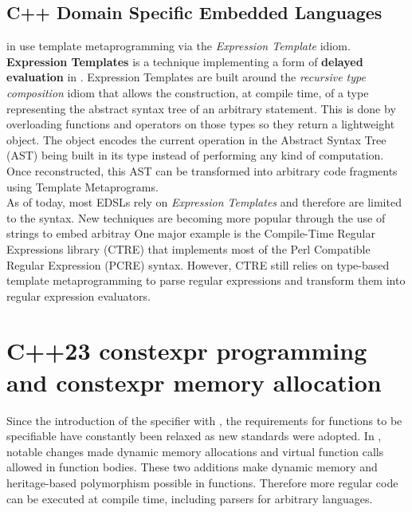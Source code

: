 \documentclass[../../main.tex]{subfiles}
\begin{document}
\subsection{C++ Domain Specific Embedded Languages}

\dsels in \cpp use template metaprogramming via the \textit{Expression
Template} idiom.
\textbf{Expression Templates} \cite{veldhuizen:1995,vandevoorde:2002} is a
technique implementing a
form of \textbf{delayed evaluation} in \cpp \cite{spinellis:2001}. Expression
Templates are built around the \textit{recursive type composition}
idiom \cite{jarvi:1998} that allows the construction, at compile time, of a type
representing the abstract syntax tree of an arbitrary statement. This is done by
overloading functions and operators on those types so they return a lightweight
object. The object encodes the current operation in the Abstract Syntax Tree
(AST) being built in its type instead of performing any kind of computation. Once
reconstructed, this AST can be transformed into arbitrary code fragments using
Template Metaprograms.\\

As of today, most \cpp EDSLs rely on \textit{Expression Templates} and therefore
are limited to the \cpp syntax. New techniques are becoming more popular through
the use of \constexpr strings to embed arbitray  One major example is
the Compile-Time Regular Expressions library (CTRE)\cite{ctre} that implements
most of the Perl Compatible Regular Expression (PCRE) syntax. However, CTRE
still relies on type-based template metaprogramming to parse regular expressions
and transform them into regular expression evaluators.


\section{C++23 constexpr programming and constexpr memory allocation}

Since the introduction of the \constexpr specifier with , the requirements
for functions to be \constexpr specifiable have constantly been relaxed as new
\cpp standards were adopted. In , notable changes made dynamic memory
allocations\cite{constexpr-memory} and virtual \constexpr function
calls\cite{virtual-constexpr} allowed in \constexpr function
bodies. These two additions make dynamic memory and heritage-based polymorphism
possible in \constexpr functions. Therefore more regular \cpp code can be
executed at compile time, including parsers for arbitrary languages.
\end{document}
